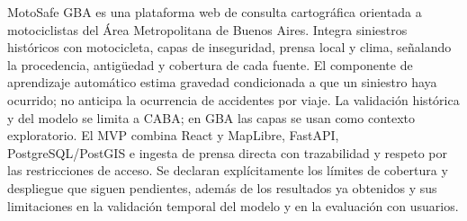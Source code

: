 
\begin{resumen}

MotoSafe GBA es una plataforma web de consulta cartográfica orientada a
motociclistas del Área Metropolitana de Buenos Aires. Integra siniestros
históricos con motocicleta, capas de inseguridad, prensa local y clima,
señalando la procedencia, antigüedad y cobertura de cada fuente. El
componente de aprendizaje automático estima gravedad condicionada a que
un siniestro haya ocurrido; no anticipa la ocurrencia de accidentes por
viaje. La validación histórica y del modelo se limita a CABA; en GBA las
capas se usan como contexto exploratorio. El MVP combina React y
MapLibre, FastAPI, PostgreSQL/PostGIS e ingesta de prensa directa con
trazabilidad y respeto por las restricciones de acceso. Se declaran
explícitamente los límites de cobertura y despliegue que siguen
pendientes, además de los resultados ya obtenidos y sus limitaciones en
la validación temporal del modelo y en la evaluación con usuarios.

\end{resumen}
